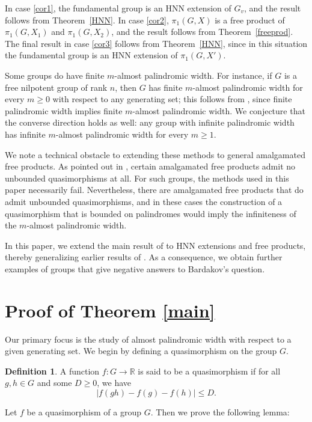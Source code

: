 \documentclass[12pt]{amsart}
\theoremstyle{definition}
\newtheorem{definition}[theorem]{Definition}
\theoremstyle{remark}
\numberwithin{equation}{subsection}
\theoremstyle{plain}
\numberwithin{equation}{section}
\begin{document}
In case \ref{cor1}, the fundamental group is an HNN extension of $G_v$, and the result follows from Theorem~\ref{HNN}. In case \ref{cor2}, $\pi_1(G,X)$ is a free product of $\pi_1(G,X_1)$ and $\pi_1(G,X_2)$, and the result follows from Theorem~\ref{freeprod}. The final result in case \ref{cor3} follows from Theorem~\ref{HNN}, since in this situation the fundamental group is an HNN extension of $\pi_1(G,X')$.

Some groups do have finite $m$-almost palindromic width. For instance, if $G$ is a free nilpotent group of rank $n$, then $G$ has finite $m$-almost palindromic width for every $m\geq 0$ with respect to any generating set; this follows from \cite{BG}, since finite palindromic width implies finite $m$-almost palindromic width. We conjecture that the converse direction holds as well: any group with infinite palindromic width has infinite $m$-almost palindromic width for every $m \geq 1$.

We note a technical obstacle to extending these methods to general amalgamated free products. As pointed out in \cite{BurgerMozes1997, BurgerMonod1999}, certain amalgamated free products admit no unbounded quasimorphisms at all. For such groups, the methods used in this paper necessarily fail. Nevertheless, there are amalgamated free products that do admit unbounded quasimorphisms, and in these cases the construction of a quasimorphism that is bounded on palindromes would imply the infiniteness of the $m$-almost palindromic width. 

 In this paper, we extend the main result of \cite{MS} to HNN extensions and free products, thereby generalizing earlier results of \cite{GK,BT}. As a consequence, we obtain further examples of groups that give negative answers to Bardakov’s question.


\section{Proof of Theorem \ref{main}}

 Our primary focus is the study of almost palindromic width with respect to a given generating set.  We begin by defining a quasimorphism on the group $G$. 
\begin{definition}
    A function $f : G \to \mathbb{R}$ is said to be a quasimorphism if for all $g,h \in G$ and some $D \geq 0$, we have $$|f(gh)-f(g)-f(h)| \leq D.$$
\end{definition}

Let $f$ be a quasimorphism of a group $G$. Then we prove the following lemma:
 
\end{document}
